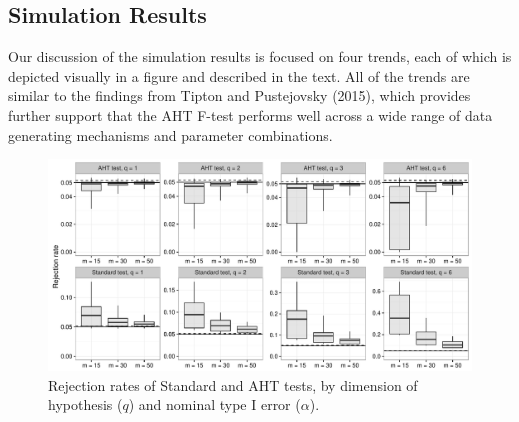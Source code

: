 \documentclass[12pt]{article}\usepackage[]{graphicx}\usepackage[]{color}
\newenvironment{knitrout}{}{} %
\begin{document}
\subsection{Simulation Results}

Our discussion of the simulation results is focused on four trends, each of which is depicted visually in a figure and described in the text. 
All of the trends are similar to the findings from Tipton and Pustejovsky (2015), which provides further support that the AHT F-test performs well across a wide range of data generating mechanisms and parameter combinations.



\begin{knitrout}
\color{fgcolor}\begin{figure}

{\centering \includegraphics[width=\linewidth]{CR_fig/overview-1} 

}

\caption[Rejection rates of Standard and AHT tests, by dimension of hypothesis (]{Rejection rates of Standard and AHT tests, by dimension of hypothesis ($q$) and nominal type I error ($\alpha$).}\label{fig:overview}
\end{figure}


\end{knitrout}
\end{document}
